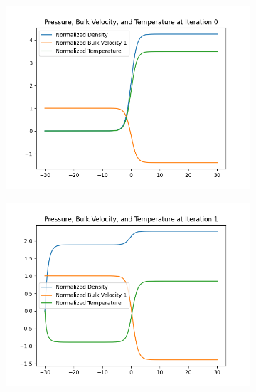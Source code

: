 \documentclass{article}
\begin{document}
\begin{figure}[h]
    \centering
    \begin{subfigure}[b]{0.45\textwidth}
    \includegraphics[width=\textwidth]{imgs/iter0.png}
        \label{fig:image1}
    \end{subfigure}
    \hfill
    \begin{subfigure}[b]{0.45\textwidth}
    \includegraphics[width=\textwidth]{imgs/iter1.png}
        \label{fig:image2}
    \end{subfigure}
    
    \vspace{1em} %
    

\end{figure}
\end{document}
